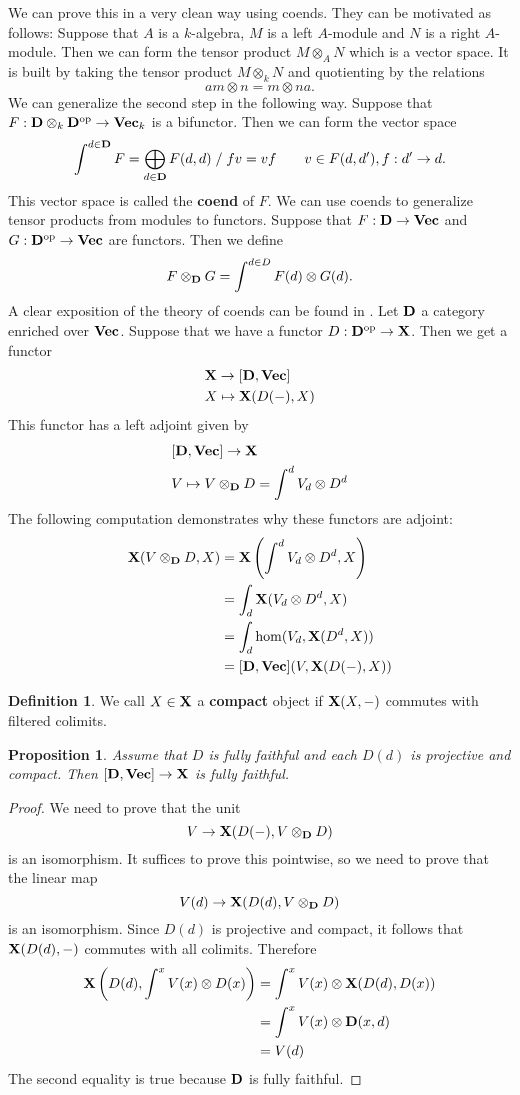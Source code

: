 \documentclass[12pt]{amsart}
\theoremstyle{plain}
\newtheorem{Proposition}[Theorem]{Proposition}
\theoremstyle{definition}
\newtheorem{Definition}[Theorem]{Definition}
\newcommand{\Vect}{{\bf Vec}}
\newcommand{\XX}{{\bf X}}
\newcommand{\DD}{{\bf D}}
\begin{document}
We can prove this in a very clean way using coends. They can be motivated as follows: Suppose that $A$ is a $k$-algebra, $M$ is a left $A$-module and $N$ is a right $A$-module. Then we can form the tensor product $M \otimes_A N$ which is a vector space. It is built by taking the tensor product $M \otimes_k N$ and quotienting by the relations
$$ a m \otimes n = m \otimes n a. $$
We can generalize the second step in the following way. Suppose that $ F : \DD \otimes_k \DD^{\rm op} \to \Vect_k $ is a bifunctor. Then we can form the vector space
\[\int^{d \in \DD} F = \bigoplus_{d \in \DD} F(d,d) \; / \; fv = vf \qquad v \in F(d,d'), f : d' \to d.\] This vector space is called the {\bf coend} of $F$. We can use coends to generalize tensor products from modules to functors. Suppose that $F : \DD \to \Vect$ and $G : \DD^{\rm op} \to \Vect$ are functors. Then we define
\[
F \otimes_{\DD} G = \int^{d \in D} F(d) \otimes G(d).
\]
A clear exposition of the theory of coends can be found in \cite{MR3221774}. Let $\DD$ a category enriched over $\Vect$. Suppose that we have a functor $D : \DD^{\rm op} \to \XX$. Then we get a functor
\begin{align*}
&\XX \to [\DD,\Vect] \\
& X \mapsto \XX(D(-),X)
\end{align*}
This functor has a left adjoint given by
\begin{align*}
&[\DD,\Vect] \to \XX \\
&V \mapsto V \otimes_{\DD} D = \int^d V_d \otimes D^d
\end{align*}
The following computation demonstrates why these functors are adjoint:
\begin{align*}
\XX(V \otimes_{\DD} D,X) &= \XX \left( \int^d V_d \otimes D^d,X \right) \\
&= \int_d \XX(V_d \otimes D^d,X) \\
&= \int_d \hom(V_d,\XX(D^d,X)) \\
&= [\DD,\Vect](V,\XX(D(-),X))
\end{align*}
\begin{Definition}
  We call $X \in \XX$ a {\bf compact} object if $\XX(X,-)$ commutes with filtered colimits.
  \end{Definition}
\begin{Proposition} \label{prop:fully_faithful}
Assume that $D$ is fully faithful and each $D(d)$ is projective and compact. Then $[\DD,\Vect] \to \XX$ is fully faithful.
\end{Proposition}
\begin{proof}
We need to prove that the unit
$$V \to \XX(D(-),V \otimes_{\DD} D)$$
is an isomorphism. It suffices to prove this pointwise, so we need to prove that the linear map
$$ V(d) \to \XX(D(d),V \otimes_{\DD} D)$$
is an isomorphism. Since $D(d)$ is projective and compact, it follows that $\XX(D(d),-)$ commutes with all colimits. Therefore
\begin{align*}
\XX \left( D(d),\int^x V(x) \otimes D(x) \right) &= \int^x V(x) \otimes \XX(D(d),D(x)) \\
&= \int^x V(x) \otimes \DD(x,d) \\
&= V(d)
\end{align*}
The second equality is true because $\DD$ is fully faithful.
\end{proof}
\end{document}

